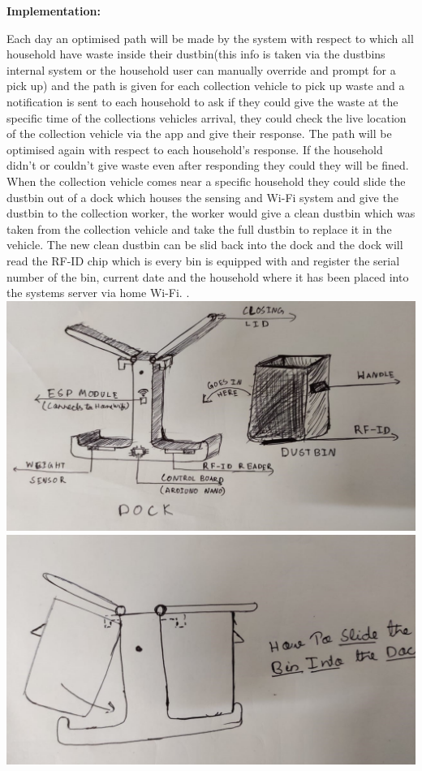 
\textbf{\textup{\huge {\bf Implementation: } \\[0.20in] }}

\normalsize { Each day an optimised path will be made by the system with respect to which all household have waste inside their dustbin(this info is taken via the dustbins internal system or the household user can manually override and prompt for a pick up) and the path is given for each collection vehicle to pick up waste and a notification is sent to each household to ask if they could give the waste at the specific time of the collections vehicles arrival, they could check the live location of the collection vehicle via the app and give their response. The path will be optimised again with respect to each household’s response. If the household didn’t or couldn’t give waste even after responding they could they will be fined.}\\[0.1in] 
\normalsize { 	When the collection vehicle comes near a specific household they could slide the dustbin out of a dock which houses the sensing and Wi-Fi system and give the dustbin to the collection worker, the worker would give a clean dustbin which was taken from the collection vehicle and take the full dustbin to replace it in the vehicle. The new clean dustbin can be slid back into the dock and the dock will read the RF-ID chip which is every bin is equipped with and register the serial number of the bin, current date and the household where it has been placed into the systems server via home Wi-Fi. 
	. }\\[0.1in]

	\includegraphics[width=\linewidth]{pic1.jpg}
\\[0.3in]
\includegraphics[width=\linewidth]{pic2.jpg}\\[0.3in]

